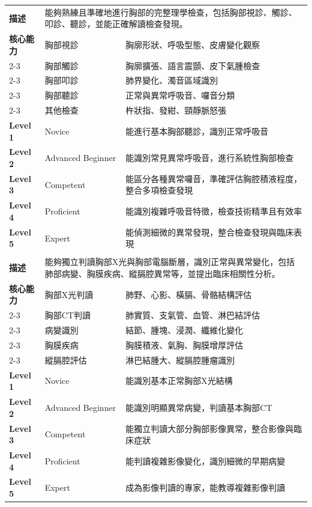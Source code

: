 \documentclass[12pt,a4paper]{article}
\begin{document}
\begin{longtable}{|p{1.2cm}|p{3.8cm}|p{8.5cm}|}
\rowcolor{emergency_red!10}
\multicolumn{3}{|c|}{\textbf{EPA 2: 胸部理學檢查}} \\
\hline
\textbf{描述} & \multicolumn{2}{|p{12.5cm}|}{能夠熟練且準確地進行胸部的完整理學檢查，包括胸部視診、觸診、叩診、聽診，並能正確解讀檢查發現。} \\
\hline
\textbf{核心能力} & 胸部視診 & 胸廓形狀、呼吸型態、皮膚變化觀察 \\
\cline{2-3}
& 胸部觸診 & 胸廓擴張、語言震顫、皮下氣腫檢查 \\
\cline{2-3}
& 胸部叩診 & 肺界變化、濁音區域識別 \\
\cline{2-3}
& 胸部聽診 & 正常與異常呼吸音、囉音分類 \\
\cline{2-3}
& 其他檢查 & 杵狀指、發紺、頸靜脈怒張 \\
\hline
\textbf{Level 1} & Novice & 能進行基本胸部聽診，識別正常呼吸音 \\
\hline
\textbf{Level 2} & Advanced Beginner & 能識別常見異常呼吸音，進行系統性胸部檢查 \\
\hline
\textbf{Level 3} & Competent & 能區分各種異常囉音，準確評估胸腔積液程度，整合多項檢查發現 \\
\hline
\textbf{Level 4} & Proficient & 能識別複雜呼吸音特徵，檢查技術精準且有效率 \\
\hline
\textbf{Level 5} & Expert & 能偵測細微的異常發現，整合檢查發現與臨床表現 \\
\hline

\rowcolor{emergency_red!10}
\multicolumn{3}{|c|}{\textbf{EPA 3: 胸部影像判讀與分析}} \\
\hline
\textbf{描述} & \multicolumn{2}{|p{12.5cm}|}{能夠獨立判讀胸部X光與胸部電腦斷層，識別正常與異常變化，包括肺部病變、胸膜疾病、縱膈腔異常等，並提出臨床相關性分析。} \\
\hline
\textbf{核心能力} & 胸部X光判讀 & 肺野、心影、橫膈、骨骼結構評估 \\
\cline{2-3}
& 胸部CT判讀 & 肺實質、支氣管、血管、淋巴結評估 \\
\cline{2-3}
& 病變識別 & 結節、腫塊、浸潤、纖維化變化 \\
\cline{2-3}
& 胸膜疾病 & 胸膜積液、氣胸、胸膜增厚評估 \\
\cline{2-3}
& 縱膈腔評估 & 淋巴結腫大、縱膈腔腫瘤識別 \\
\hline
\textbf{Level 1} & Novice & 能識別基本正常胸部X光結構 \\
\hline
\textbf{Level 2} & Advanced Beginner & 能識別明顯異常病變，判讀基本胸部CT \\
\hline
\textbf{Level 3} & Competent & 能獨立判讀大部分胸部影像異常，整合影像與臨床症狀 \\
\hline
\textbf{Level 4} & Proficient & 能判讀複雜影像變化，識別細微的早期病變 \\
\hline
\textbf{Level 5} & Expert & 成為影像判讀的專家，能教導複雜影像判讀 \\
\hline


\end{longtable}
\end{document}
